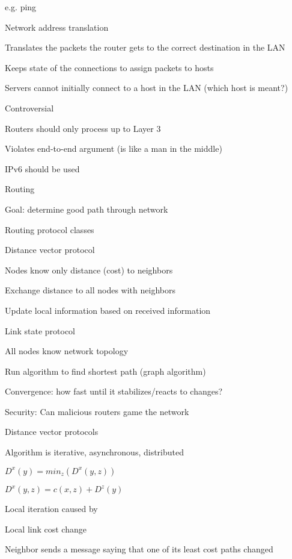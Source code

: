 		\item e.g. ping
	\enumend
	\item Network address translation
	\enumstart
		\item Translates the packets the router gets to the correct destination in the LAN
		\item Keeps state of the connections to assign packets to hosts
		\item Servers cannot initially connect to a host in the LAN (which host is meant?)
		\item Controversial
		\enumstart
			\item Routers should only process up to Layer 3
			\item Violates end-to-end argument (is like a man in the middle)
			\item IPv6 should be used
		\enumend
	\enumend
	\item Routing
	\enumstart
		\item Goal: determine good path through network
		\item Routing protocol classes
		\enumstart
			\item Distance vector protocol
			\enumstart
				\item Nodes know only distance (cost) to neighbors
				\item Exchange distance to all nodes with neighbors
				\item Update local information based on received information
			\enumend
			\item Link state protocol
			\enumstart
				\item All nodes know network topology
				\item Run algorithm to find shortest path (graph algorithm)
			\enumend
			\item Convergence: how fast until it stabilizes/reacts to changes?
			\item Security: Can malicious routers game the network
		\enumend
		\item Distance vector protocols
		\enumstart
			\item Algorithm is iterative, asynchronous, distributed
			\item $D^x(y) = min_z(D^x(y,z))$
			\item $D^x(y,z) = c(x,z) + D^z(y)$
			\item Local iteration caused by
			\enumstart
				\item Local link cost change
				\item Neighbor sends a message saying that one of its least cost paths changed
